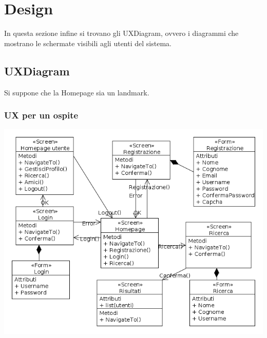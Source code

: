 \section{Design}
In questa sezione infine si trovano gli UXDiagram, ovvero i diagrammi che mostrano le schermate visibili agli utenti del sistema.
\subsection{UXDiagram}
Si suppone che la Homepage sia un landmark.
\subsubsection{UX per un ospite}
\begin{center}
 \includegraphics[width=1\columnwidth]{uxaccesso.png}
\end{center}
\pagebreak
